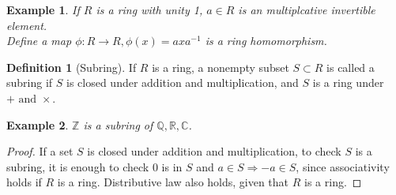 \documentclass{article}
\theoremstyle{MyNonumberplain}
\theoremstyle{break}
\newtheorem*{proof}{Proof. }
\newcommand{\infixand}{\text{ and }}
\theoremstyle{break}
\newtheorem{example}{Example}[section]
\theoremstyle{break}
\theoremstyle{definition}
\theoremstyle{break}
\newtheorem{definition}{Definition}[section]
\begin{document}
\begin{expbox}
    \begin{example}
        If $R$ is a ring with unity 1, $a \in R$ is an multiplcative invertible
        element.\\
        
        Define a map $\phi : R \rightarrow R, \phi (x) = a x a^{- 1}$ is a ring
        homomorphism.
    \end{example}
\end{expbox}
\begin{defbox}
    \begin{definition}[Subring]
        If $R$ is a ring, a nonempty subset $S \subset R$ is called a subring if $S$
        is closed under addition and multiplication, and $S$ is a ring under $+
        \infixand \times$.
    \end{definition}
\end{defbox}

\begin{expbox}
    \begin{example}
        $\mathbb{Z}$ is a subring of $\mathbb{Q}, \mathbb{R}, \mathbb{C}$.
    \end{example}
    \begin{prfbox}
        \begin{proof}
            If a set $S$ is closed under addition and multiplication, to check $S$ is a
            subring, it is enough to check $0$ is in $S$ and $a \in S \Rightarrow - a \in S$, since associativity holds if $R$ is a ring. Distributive law also holds, given that $R$ is a ring.

        \end{proof}
    \end{prfbox}
\end{expbox}
\end{document}
